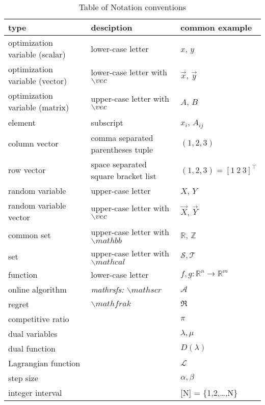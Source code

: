 \documentclass[preview]{standalone}
\begin{document}
    
\begin{table} \footnotesize  
    \caption{Table of Notation conventions}
    \begin{tabularx}{\linewidth}{lll}
    \hline
    type & desciption & common example \\ \hline \hline
    optimization variable (scalar) & lower-case letter & $x$, $y$ \\
    optimization variable (vector) & lower-case letter with $\backslash vec$ & $\vec{x}$, $\vec{y}$ \\
    optimization variable (matrix) & upper-case letter with $\backslash vec$ & ${A}$, ${B}$ \\
    element & subscript & ${x}_i$, ${A}_{ij}$ \\
    column vector & comma separated parentheses tuple &  $(1,2,3)$\\
    row vector & space separated square bracket list &  $(1,2,3) = [1\ 2\ 3]^{\top}$\\
    random variable & upper-case letter & $X$, $Y$ \\
    random variable vector & upper-case letter with $\backslash vec$ & $\vec{X}$, $\vec{Y}$ \\
    common set & upper-case letter with $\backslash mathbb$ & $\mathbb{R}$, $\mathbb{Z}$ \\
    set & upper-case letter with $\backslash mathcal$ & $\mathcal{S}, \mathcal{T} $ \\
    function & lower-case letter & $f,g:\mathbb{R}^n \rightarrow \mathbb{R}^m$ \\
    \hline \hline
    online algorithm & \emph{mathrsfs: $\backslash mathscr$ }  & $\mathscr{A}$ \\
    regret & $\backslash mathfrak$ & $\mathfrak{R}$ \\
    competitive ratio && $\pi$ \\
    dual variables && $\lambda, \mu $ \\
    dual function &&  $D(\lambda)$ \\
    Lagrangian function && $\mathcal{L}$ \\
    step size && $\alpha,\beta$ \\
    integer interval & & [N] = \{1,2,\dots,N\} \\
    \hline \hline
    \end{tabularx}
\end{table}
\end{document}
